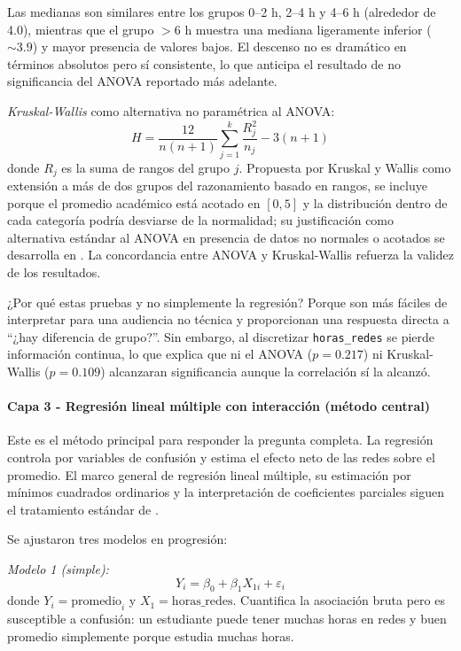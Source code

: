 \documentclass[12pt]{article}
\begin{document}
Las medianas son similares entre los grupos 0–2 h, 2–4 h y 4–6 h (alrededor de 4.0), mientras que el grupo \(>6\) h muestra una mediana ligeramente inferior (\(\sim3.9\)) y mayor presencia de valores bajos. El descenso no es dramático en términos absolutos pero sí consistente, lo que anticipa el resultado de no significancia del ANOVA reportado más adelante.

\textit{Kruskal-Wallis} como alternativa no paramétrica al ANOVA:
\[
H = \frac{12}{n(n+1)} \sum_{j=1}^{k} \frac{R_j^2}{n_j} - 3(n+1)
\]
donde \(R_j\) es la suma de rangos del grupo \(j\). Propuesta por Kruskal y Wallis \cite{kruskalwallis1952} como extensión a más de dos grupos del razonamiento basado en rangos, se incluye porque el promedio académico está acotado en \([0, 5]\) y la distribución dentro de cada categoría podría desviarse de la normalidad; su justificación como alternativa estándar al ANOVA en presencia de datos no normales o acotados se desarrolla en \cite{conover1999}. La concordancia entre ANOVA y Kruskal-Wallis refuerza la validez de los resultados.

¿Por qué estas pruebas y no simplemente la regresión? Porque son más fáciles de interpretar para una audiencia no técnica y proporcionan una respuesta directa a ``¿hay diferencia de grupo?''. Sin embargo, al discretizar \texttt{horas\_redes} se pierde información continua, lo que explica que ni el ANOVA (\(p = 0.217\)) ni Kruskal-Wallis (\(p = 0.109\)) alcanzaran significancia aunque la correlación sí la alcanzó.

\paragraph{Capa 3 - Regresión lineal múltiple con interacción (método central)}

Este es el método principal para responder la pregunta completa. La regresión controla por variables de confusión y estima el efecto neto de las redes sobre el promedio. El marco general de regresión lineal múltiple, su estimación por mínimos cuadrados ordinarios y la interpretación de coeficientes parciales siguen el tratamiento estándar de \cite{kutner2005}.

Se ajustaron tres modelos en progresión:

\textit{Modelo 1 (simple):}
\[
Y_i = \beta_0 + \beta_1 X_{1i} + \varepsilon_i
\]
donde \(Y_i = \text{promedio}_i\) y \(X_1 = \text{horas\_redes}\). Cuantifica la asociación bruta pero es susceptible a confusión: un estudiante puede tener muchas horas en redes y buen promedio simplemente porque estudia muchas horas.
\end{document}
